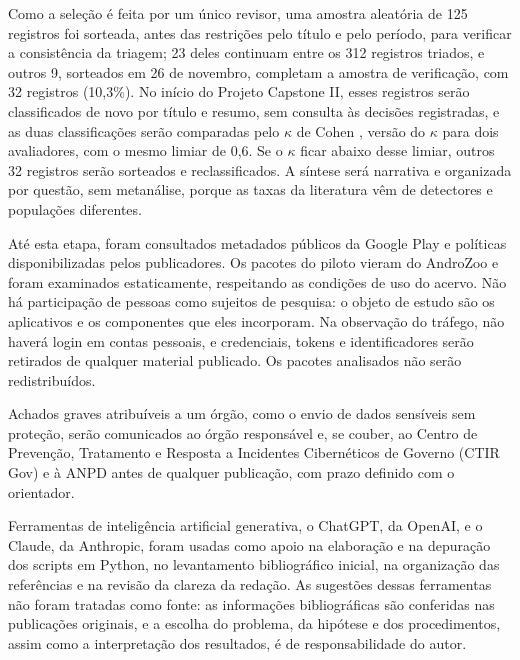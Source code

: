 Como a seleção é feita por um único revisor, uma amostra aleatória de 125 registros foi sorteada, antes das restrições pelo título e pelo período, para verificar a consistência da triagem; 23 deles continuam entre os 312 registros triados, e outros 9, sorteados em 26 de novembro, completam a amostra de verificação, com 32 registros (10,3\%). No início do Projeto Capstone II, esses registros serão classificados de novo por título e resumo, sem consulta às decisões registradas, e as duas classificações serão comparadas pelo $\kappa$ de Cohen \cite{cohen1960}, versão do $\kappa$ para dois avaliadores, com o mesmo limiar de 0,6. Se o $\kappa$ ficar abaixo desse limiar, outros 32 registros serão sorteados e reclassificados. A síntese será narrativa e organizada por questão, sem metanálise, porque as taxas da literatura vêm de detectores e populações diferentes.

\label{sec:etica}

Até esta etapa, foram consultados metadados públicos da Google Play e políticas disponibilizadas pelos publicadores. Os pacotes do piloto vieram do AndroZoo e foram examinados estaticamente, respeitando as condições de uso do acervo. Não há participação de pessoas como sujeitos de pesquisa: o objeto de estudo são os aplicativos e os componentes que eles incorporam. Na observação do tráfego, não haverá login em contas pessoais, e credenciais, tokens e identificadores serão retirados de qualquer material publicado. Os pacotes analisados não serão redistribuídos.

Achados graves atribuíveis a um órgão, como o envio de dados sensíveis sem proteção, serão comunicados ao órgão responsável e, se couber, ao Centro de Prevenção, Tratamento e Resposta a Incidentes Cibernéticos de Governo (CTIR Gov) e à ANPD antes de qualquer publicação, com prazo definido com o orientador.

Ferramentas de inteligência artificial generativa, o ChatGPT, da OpenAI, e o Claude, da Anthropic, foram usadas como apoio na elaboração e na depuração dos scripts em Python, no levantamento bibliográfico inicial, na organização das referências e na revisão da clareza da redação. As sugestões dessas ferramentas não foram tratadas como fonte: as informações bibliográficas são conferidas nas publicações originais, e a escolha do problema, da hipótese e dos procedimentos, assim como a interpretação dos resultados, é de responsabilidade do autor.

\label{sec:recursos}

